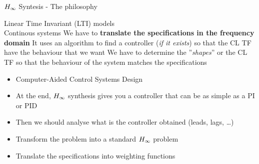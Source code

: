\documentclass[../main/main.tex]{subfiles}
\begin{document}
\begin{frame}{\(\hinf\) Syntesis - The philosophy}
  \begin{overprint}
    \begin{tcolorbox}[size=small,
      top=4pt,
      halign=center,
      colback=blue!5!white,
      colframe=blue!50!black,
      subtitle style={boxrule=0.4pt,
        colback=blue!50!black},
      title=\(\hinf\) Synthesis - Hypothesis]
      Linear Time Invariant (LTI) models\\
      Continous systems
      We have to \textbf{translate the specifications in the frequency domain}
      It uses an algorithm to find a controller (\emph{if it exists}) so that the CL TF have the behaviour that we want
      We have to determine the ''\emph{shapes}'' or the CL TF so that the behaviour of the system matches the specifications
    \end{tcolorbox}
    \begin{tcolorbox}[size=small,
      top=4pt,
      halign=center,
      colback=blue!5!white,
      colframe=blue!50!black,
      subtitle style={boxrule=0.4pt,
        colback=blue!50!black},
      title=\(\hinf\) Synthesis]
      \begin{itemize}
      \item Computer-Aided Control Systems Design
      \item At the end, \(\hinf\) synthesis gives you a controller that can be as
        simple as a PI or PID
      \item Then we should analyse what is the controller obtained (leads, lags, \ldots)
      \end{itemize}
      \begin{itemize}
      \item Transform the problem into a standard \(\hinf\) problem
      \item Translate the specifications into weighting functions
      \end{itemize}
    \end{tcolorbox}
  \end{overprint}
\end{frame}
\end{document}

